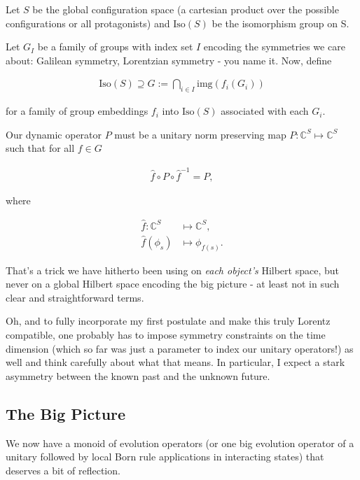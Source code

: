 \documentclass{article}
\begin{document}
Let $S$ be the global configuration space (a cartesian product over the possible configurations or all protagonists) and $\mathrm{Iso}(S)$ be the isomorphism group on S.

Let $G_I$ be a family of groups with index set $I$ encoding the symmetries we care about: Galilean symmetry, Lorentzian symmetry - you name it. Now, define

\begin{align*}
\mathrm{Iso}(S) \supseteq G := \bigcap_{i\in I}\mathrm{img}(f_i(G_i))
\end{align*}

for a family of group embeddings $f_i$ into $\mathrm{Iso}(S)$ associated with each $G_i$.

Our dynamic operator $P$ must be a unitary norm preserving map $P:\mathbb{C}^S\longmapsto\mathbb{C}^S$ such that for all $f\in G$

\begin{mdframed}
\begin{align*}
\hat{f}\circ P\circ \hat{f}^{-1} = P,
\end{align*}

where

\begin{align*}
\hat{f}:\mathbb{C}^S &\longmapsto \mathbb{C}^S,\\ \hat{f}(\phi_s) &\mapsto \phi_{f(s)}.
\end{align*}
\end{mdframed}

That's a trick we have hitherto been using on \textit{each object's} Hilbert space, but never on a global Hilbert space encoding the big picture - at least not in such clear and straightforward terms.

Oh, and to fully incorporate my first postulate and make this truly Lorentz compatible, one probably has to impose symmetry constraints on the time dimension (which so far was just a parameter to index our unitary operators!) as well and think carefully about what that means. In particular, I expect a stark asymmetry between the known past and the unknown future.

\subsection{The Big Picture}

We now have a monoid of evolution operators (or one big evolution operator of a unitary followed by local Born rule applications in interacting states) that deserves a bit of reflection.
\end{document}
